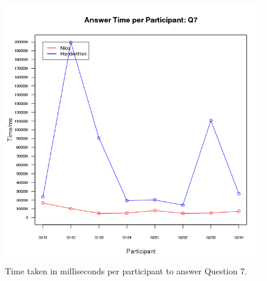 \documentclass[12pt,twoside,notitlepage,xetex]{report}
\begin{document}
\begin{center}
\begin{figure}[H]
\begin{center}
\includegraphics[height=\textheight/2-2cm]{figs/graphs/q7.png}
\end{center}
\caption{Time taken in milliseconds per participant to answer Question 7.}
\end{figure}
\end{center}
\end{document}
